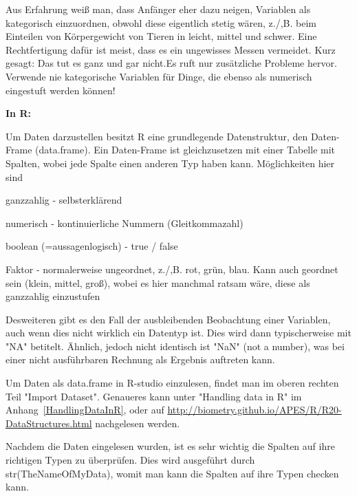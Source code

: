 \documentclass[a4paper,twoside]{tufte-book}\usepackage[]{graphicx}\usepackage[]{color}
\begin{document}
	Aus Erfahrung weiß man, dass Anfänger eher dazu neigen, Variablen als kategorisch einzuordnen, obwohl diese eigentlich stetig wären, z./,B. beim Einteilen von Körpergewicht von Tieren in leicht, mittel und schwer. Eine Rechtfertigung dafür ist meist, dass es ein ungewisses Messen vermeidet. Kurz gesagt: Das tut es ganz und gar nicht.Es ruft nur zusätzliche Probleme hervor. Verwende nie kategorische Variablen für Dinge, die ebenso als numerisch eingestuft werden können!
	
	
	\vspace{1cm}
	\begin{fullwidth}
		\begin{mdframed}
			
			\textbf{In R:} 
			
			Um Daten darzustellen besitzt R eine grundlegende Datenstruktur, den Daten-Frame (data.frame). Ein Daten-Frame ist gleichzusetzen mit einer Tabelle mit Spalten, wobei jede Spalte einen anderen Typ haben kann. Möglichkeiten hier sind
			
			\begin{itemize*}
				\item ganzzahlig - selbsterklärend
				\item numerisch - kontinuierliche Nummern (Gleitkommazahl)
				\item boolean (=aussagenlogisch) - true / false
				\item Faktor - normalerweise ungeordnet, z./,B. rot, grün, blau. Kann auch geordnet sein (klein, mittel, groß), wobei es hier manchmal ratsam wäre, diese als ganzzahlig einzustufen
			\end{itemize*}
			
			Desweiteren gibt es den Fall der ausbleibenden Beobachtung einer Variablen, auch wenn dies nicht wirklich ein Datentyp ist. Dies wird dann typischerweise mit "NA" betitelt. Ähnlich, jedoch nicht identisch ist "NaN" (not a number), was bei einer nicht ausführbaren Rechnung als Ergebnis auftreten kann.
			
			Um Daten als data.frame in R-studio einzulesen, findet man im oberen rechten Teil "Import Dataset". Genaueres kann unter "Handling data in R" im Anhang~\ref{HandlingDataInR}, oder auf \href{http://biometry.github.io/APES/R/R20-DataStructures.html}{http://biometry.github.io/APES/R/R20-DataStructures.html} nachgelesen werden.
			
			Nachdem die Daten eingelesen wurden, ist es sehr wichtig die Spalten auf ihre richtigen Typen zu überprüfen. Dies wird ausgeführt durch str(TheNameOfMyData), womit man kann die Spalten auf ihre Typen checken kann.
			
		\end{mdframed}
	\end{fullwidth}
	
\end{document}
